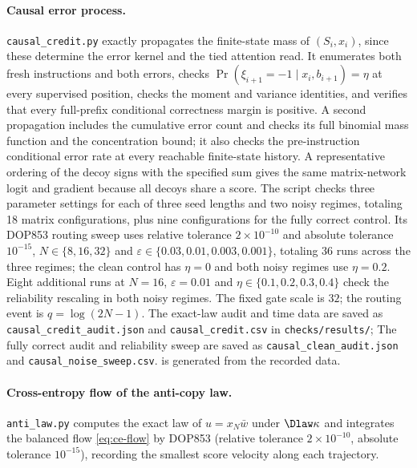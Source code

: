 \paragraph{Causal error process.}
\texttt{causal\_credit.py} exactly propagates the finite-state mass of $(S_i,x_i)$, since these determine the error kernel and the tied attention read.
It enumerates both fresh instructions and both errors, checks $\Pr(\xi_{i+1}=-1\mid x_i,b_{i+1})=\eta$ at every supervised position,
checks the moment and variance identities, and verifies that every full-prefix conditional correctness margin is positive.
A second propagation includes the cumulative error count and checks its full binomial mass function and the concentration bound;
it also checks the pre-instruction conditional error rate at every reachable finite-state history.
A representative ordering of the decoy signs with the specified sum gives the same matrix-network logit and gradient because all decoys share a score.
The script checks three parameter settings for each of three seed lengths and two noisy regimes, totaling 18 matrix configurations,
plus nine configurations for the fully correct control.
Its DOP853 routing sweep uses relative tolerance $2\times10^{-10}$ and absolute tolerance $10^{-15}$,
$N\in\{8,16,32\}$ and $\varepsilon\in\{0.03,0.01,0.003,0.001\}$, totaling 36 runs across the three regimes;
the clean control has $\eta=0$ and both noisy regimes use $\eta=0.2$.
Eight additional runs at $N=16$, $\varepsilon=0.01$ and $\eta\in\{0.1,0.2,0.3,0.4\}$ check the reliability rescaling in both noisy regimes.
The fixed gate scale is $32$; the routing event is $q=\log(2N-1)$.
The exact-law audit and time data are saved as \texttt{causal\_credit\_audit.json} and \texttt{causal\_credit.csv} in \texttt{checks/results/};
The fully correct audit and reliability sweep are saved as \texttt{causal\_clean\_audit.json} and \texttt{causal\_noise\_sweep.csv}.
 is generated from the recorded data.

\paragraph{Cross-entropy flow of the anti-copy law.}
\texttt{anti\_law.py} computes the exact law of $u=x_N\bar w$ under $\Dlaw\kappa$ and integrates the balanced flow \cref{eq:ce-flow}
by DOP853 (relative tolerance $2\times10^{-10}$, absolute tolerance $10^{-15}$), recording the smallest score velocity along each trajectory.

